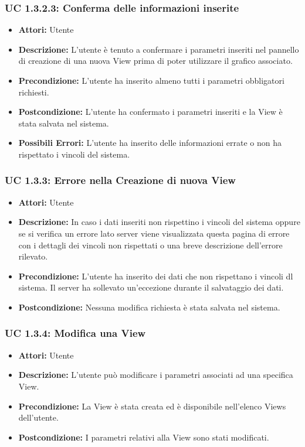 \subsubsection{UC 1.3.2.3: Conferma delle informazioni inserite}

\begin{itemize}
\item \textbf{Attori:} Utente
\item \textbf{Descrizione:} L'utente è tenuto a confermare i parametri inseriti nel pannello di creazione di una nuova View prima di poter utilizzare il grafico associato.
\item \textbf{Precondizione:} L'utente ha inserito almeno tutti i parametri obbligatori richiesti.
\item \textbf{Postcondizione:} L'utente ha confermato i parametri inseriti e la View è stata salvata nel sistema.
\item \textbf{Possibili Errori:} L'utente ha inserito delle informazioni errate o non ha rispettato i vincoli del sistema. 
\end{itemize}

\subsubsection{UC 1.3.3: Errore nella Creazione di nuova View}

\begin{itemize}
\item \textbf{Attori:} Utente
\item \textbf{Descrizione:} In caso i dati inseriti non rispettino i vincoli del sistema oppure se si verifica un errore lato server viene visualizzata questa pagina di errore con i dettagli dei vincoli non rispettati o una breve descrizione dell'errore rilevato.
\item \textbf{Precondizione:} L'utente ha inserito dei dati che non rispettano i vincoli dl sistema. Il server ha sollevato un'eccezione durante il salvataggio dei dati.
\item \textbf{Postcondizione:} Nessuna modifica richiesta è stata salvata nel sistema.
\end{itemize}

\subsubsection{UC 1.3.4: Modifica una View}

\begin{itemize}
\item \textbf{Attori:} Utente
\item \textbf{Descrizione:} L'utente può modificare i parametri associati ad una specifica View.
\item \textbf{Precondizione:} La View è stata creata ed è disponibile nell'elenco Views dell'utente.
\item \textbf{Postcondizione:} I parametri relativi alla View sono stati modificati.
\end{itemize}

